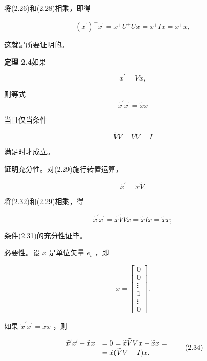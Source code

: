 将(2.26)和(2.28)相乘，即得

\begin{equation*}
\left(x ^ {\prime}\right) ^ {+} x ^ {\prime} = x ^ {+} U ^ {+} U x = x ^ {+} I x = x ^ {+} x,
\end{equation*}

这就是所要证明的。

\textbf{定理 2.4}\quad 如果

\begin{equation*}
x ^ {\prime} = V x,\tag{2.29}
\end{equation*}

则等式
\begin{equation*}
\tilde {x} ^ {\prime} x ^ {\prime} = \tilde {x} x\tag{2.30}
\end{equation*}

当且仅当条件

\begin{equation*}
\widetilde {V} V = V \widetilde {V} = I\tag{2.31}
\end{equation*}

满足时才成立。

\textbf{证明}\quad 充分性。对(2.29)施行转置运算，

\begin{equation*}
\tilde {x} ^ {\prime} = \tilde {x} \tilde {V}.\tag{2.32}
\end{equation*}

将(2.32)和(2.29)相乘，得

\begin{equation*}
\widetilde {x} ^ {\prime} x ^ {\prime} = \widetilde {x} \widetilde {V} V x = \widetilde {x} I x = \widetilde {x} x;
\end{equation*}

条件(2.31)的充分性证毕。

必要性。设 $x$ 是单位矢量 $e_{i}$ ，即

\begin{equation*}
x = \left[ \begin{array}{c} 0 \\ 0 \\ \vdots \\ 1 \\ \vdots \\ 0 \end{array} \right].\tag{2.33}
\end{equation*}

如果 $\widetilde{x}^{\prime}x^{\prime} = \widetilde{x} x$ ，则

\begin{equation*}
\begin{array}{r l} \widetilde {x} ^ {\prime} x ^ {\prime} - \widetilde {x} x & = 0 = \widetilde {x} \widetilde {V} V x - \widetilde {x} x = \\ & = \widetilde {x} (\widetilde {V} V - I) x. \end{array}\tag{2.34}
\end{equation*}

